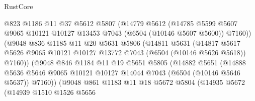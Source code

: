 \begin{lexlean}{RustCore}
\begin{coremodule}
                          @823
                          @1186
                          @11
                          @37
                          @5612
                          @5807
                          (@14779
                            @5612
                            (@14785
                              @5599
                              @5607
                              @9065
                              @10121
                              @10127
                              @13453
                              @7043
                              (@6504 (@10146 @5607 @5600))
                              @7160))
                          (@9048
                            @836
                            @1185
                            @11
                            @20
                            @5631
                            @5806
                            (@14811
                              @5631
                              (@14817
                                @5617
                                @5626
                                @9065
                                @10121
                                @10127
                                @13772
                                @7043
                                (@6504 (@10146 @5626 @5618))
                                @7160))
                            (@9048
                              @846
                              @1184
                              @11
                              @19
                              @5651
                              @5805
                              (@14882
                                @5651
                                (@14888
                                  @5636
                                  @5646
                                  @9065
                                  @10121
                                  @10127
                                  @14044
                                  @7043
                                  (@6504 (@10146 @5646 @5637))
                                  @7160))
                              (@9048
                                @861
                                @1183
                                @11
                                @18
                                @5672
                                @5804
                                (@14935
                                  @5672
                                  (@14939
                                    @1510
                                    @1526
                                    @5656

\end{coremodule}
\end{lexlean}
